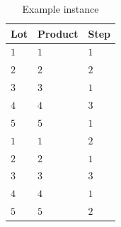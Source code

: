 \begin{table}[ht]
	\caption{Example instance}\label{tab:instance} \centering
	\begin{tabular}{|l|l|l|}
		\hline
		Lot & Product & Step \\ \hline
		$1$ & $1$ & $1$ \\
		$2$ & $2$ & $2$  \\
		$3$ & $3$ & $1$ \\
		$4$ & $4$ & $3$ \\
		$5$ & $5$ & $1$ \\
		$1$ & $1$ & $2$     \\
		$2$ & $2$ & $1$  \\
		$3$ & $3$ & $3$        \\
		$4$ & $4$ & $1$     \\
		$5$ & $5$ & $2$  \\
		\hline
	\end{tabular}
\end{table}
%

